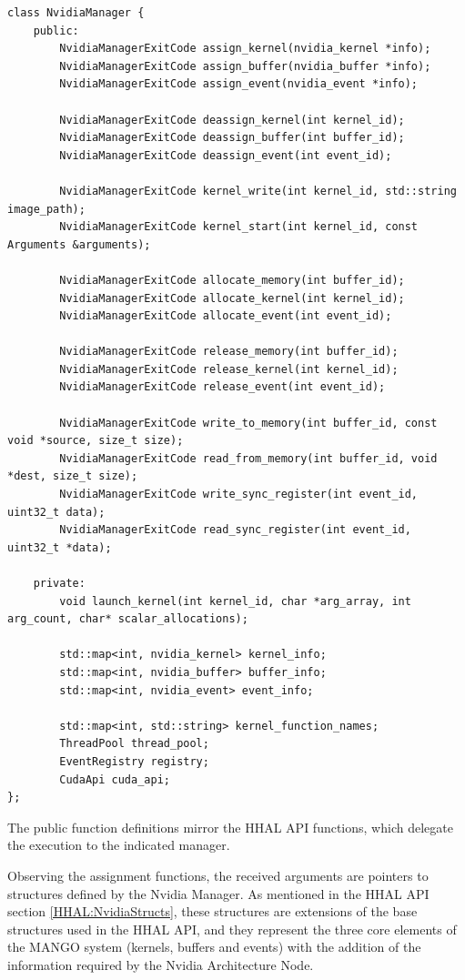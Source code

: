\begin{lstlisting}[style=CStyle, caption=HHAL Nvidia Manager - Manager Class]
class NvidiaManager {
    public:
        NvidiaManagerExitCode assign_kernel(nvidia_kernel *info);
        NvidiaManagerExitCode assign_buffer(nvidia_buffer *info);
        NvidiaManagerExitCode assign_event(nvidia_event *info);

        NvidiaManagerExitCode deassign_kernel(int kernel_id);
        NvidiaManagerExitCode deassign_buffer(int buffer_id);
        NvidiaManagerExitCode deassign_event(int event_id);

        NvidiaManagerExitCode kernel_write(int kernel_id, std::string image_path);
        NvidiaManagerExitCode kernel_start(int kernel_id, const Arguments &arguments);

        NvidiaManagerExitCode allocate_memory(int buffer_id);
        NvidiaManagerExitCode allocate_kernel(int kernel_id);
        NvidiaManagerExitCode allocate_event(int event_id);
        
        NvidiaManagerExitCode release_memory(int buffer_id);
        NvidiaManagerExitCode release_kernel(int kernel_id);
        NvidiaManagerExitCode release_event(int event_id);

        NvidiaManagerExitCode write_to_memory(int buffer_id, const void *source, size_t size);
        NvidiaManagerExitCode read_from_memory(int buffer_id, void *dest, size_t size);
        NvidiaManagerExitCode write_sync_register(int event_id, uint32_t data);
        NvidiaManagerExitCode read_sync_register(int event_id, uint32_t *data);
       
    private:
        void launch_kernel(int kernel_id, char *arg_array, int arg_count, char* scalar_allocations);

        std::map<int, nvidia_kernel> kernel_info;
        std::map<int, nvidia_buffer> buffer_info;
        std::map<int, nvidia_event> event_info;

        std::map<int, std::string> kernel_function_names;
        ThreadPool thread_pool;
        EventRegistry registry;
        CudaApi cuda_api;
};
\end{lstlisting}

The public function definitions mirror the HHAL API functions, which delegate the execution to the indicated manager. 

Observing the assignment functions, the received arguments are pointers to structures defined by the Nvidia Manager. As mentioned in the HHAL API section \ref{HHAL:NvidiaStructs}, these structures are extensions of the base structures used in the HHAL API, and they represent the three core elements of the MANGO system (kernels, buffers and events) with the addition of the information required by the Nvidia Architecture Node.

